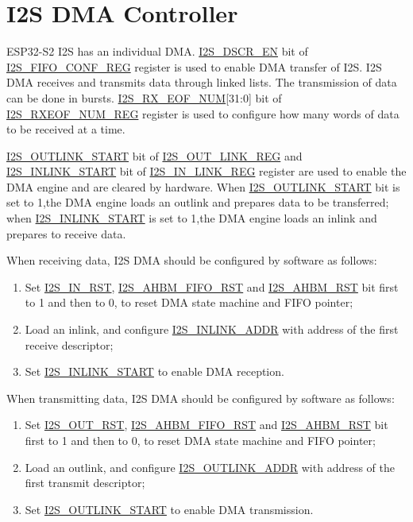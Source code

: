 \documentclass[main\_\_EN.tex]{subfiles}
\begin{document}
\section{I2S DMA Controller}

ESP32-S2 I2S has an individual DMA. \hyperref[fielddesc:I2SDSCREN]{I2S\_DSCR\_EN} bit of \hyperref[regdesc:I2SFIFOCONFREG]{I2S\_FIFO\_CONF\_REG} register is used to enable DMA transfer of I2S. I2S DMA receives and transmits data through linked lists. The transmission of data can be done in bursts. \hyperref[fielddesc:I2SRXEOFNUM]{I2S\_RX\_EOF\_NUM}[31:0] bit of \hyperref[regdesc:I2SRXEOFNUMREG]{I2S\_RXEOF\_NUM\_REG} register is used to configure how many words of data to be received at a time.

\hyperref[fielddesc:I2SOUTLINKSTART]{I2S\_OUTLINK\_START} bit of \hyperref[regdesc:I2SOUTLINKREG]{I2S\_OUT\_LINK\_REG} and \hyperref[fielddesc:I2SINLINKSTART]{I2S\_INLINK\_START} bit of \hyperref[regdesc:I2SINLINKREG]{I2S\_IN\_LINK\_REG} register are used to enable the DMA engine and are cleared by hardware. When \hyperref[fielddesc:I2SOUTLINKSTART]{I2S\_OUTLINK\_START} bit is set to 1,the DMA engine loads an outlink and prepares data to be transferred; when \hyperref[fielddesc:I2SINLINKSTART]{I2S\_INLINK\_START} is set to 1,the DMA engine loads an inlink and prepares to receive data.

When receiving data, I2S DMA should be configured by software as follows:
\begin{enumerate}
   \item Set \hyperref[fielddesc:I2SINRST]{I2S\_IN\_RST}, \hyperref[fielddesc:I2SAHBMFIFORST]{I2S\_AHBM\_FIFO\_RST} and \hyperref[fielddesc:I2SAHBMRST]{I2S\_AHBM\_RST} bit first to 1 and then to 0, to reset DMA state machine and FIFO pointer;
   \item Load an inlink, and configure \hyperref[fielddesc:I2SINLINKADDR]{I2S\_INLINK\_ADDR} with address of the first receive descriptor;
   \item Set \hyperref[fielddesc:I2SINLINKSTART]{I2S\_INLINK\_START} to enable DMA reception.
\end{enumerate}

When transmitting data, I2S DMA should be configured by software as follows:
\begin{enumerate}
   \item Set \hyperref[fielddesc:I2SOUTRST]{I2S\_OUT\_RST}, \hyperref[fielddesc:I2SAHBMFIFORST]{I2S\_AHBM\_FIFO\_RST} and \hyperref[fielddesc:I2SAHBMRST]{I2S\_AHBM\_RST} bit first to 1 and then to 0, to reset DMA state machine and FIFO pointer;
   \item Load an outlink, and configure \hyperref[fielddesc:I2SOUTLINKADDR]{I2S\_OUTLINK\_ADDR} with address of the first transmit descriptor;
   \item Set \hyperref[fielddesc:I2SOUTLINKSTART]{I2S\_OUTLINK\_START} to enable DMA transmission.
\end{enumerate}
\end{document}
